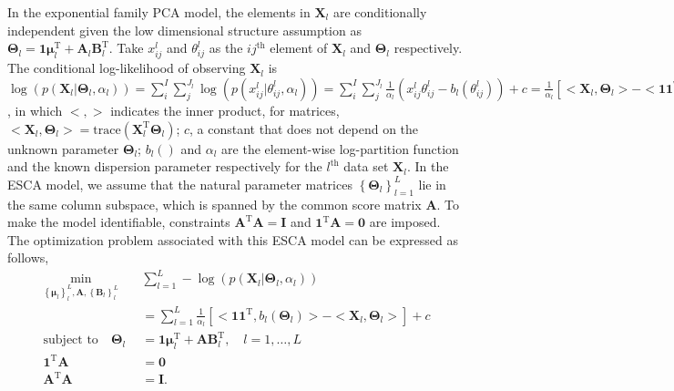 In the exponential family PCA model, the elements in $\mathbf{X}_l$ are conditionally independent given the low dimensional structure assumption as $\mathbf{\Theta}_l = \mathbf{1}\bm{\mu}_l^{\text{T}} + \mathbf{A}_l\mathbf{B}_l^{\text{T}}$. Take $x_{ij}^{l}$ and $\theta_{ij}^{l}$ as the $ij^{\text{th}}$ element of $\mathbf{X}_l$ and $\mathbf{\Theta}_l$ respectively. The conditional log-likelihood of observing $\mathbf{X}_l$ is $\log(p(\mathbf{X}_l|\mathbf{\Theta}_l,\alpha_l)) =  \sum_{i}^{I}\sum_{j}^{J_l} \log(p(x_{ij}^{l}|\theta_{ij}^{l},\alpha_l)) = \sum_{i}^{I}\sum_{j}^{J_l} \frac{1}{\alpha_l}  (x_{ij}^{l}\theta_{ij}^{l} - b_l(\theta_{ij}^{l})) + c = \frac{1}{\alpha_l} \left[<\mathbf{X}_{l},\mathbf{\Theta}_l> - <\mathbf{1}\mathbf{1}^{\text{T}}, b_l(\mathbf{\Theta}_l)>\right] + c$, in which $<,>$ indicates the inner product, for matrices, $<\mathbf{X}_l,\mathbf{\Theta}_l> = \text{trace}(\mathbf{X}_l^{\text{T}}\mathbf{\Theta}_l)$; $c$, a constant that does not depend on the unknown parameter $\mathbf{\Theta}_l$; $b_l()$ and $\alpha_l$ are the element-wise log-partition function and the known dispersion parameter respectively for the $l^{\text{th}}$ data set $\mathbf{X}_l$. In the ESCA model, we assume that the natural parameter matrices $\left\{ \mathbf{\Theta}_l \right\}_{l=1}^{L}$ lie in the same column subspace, which is spanned by the common score matrix $\mathbf{A}$. To make the model identifiable, constraints $\mathbf{A}^{\text{T}}\mathbf{A} = \mathbf{I}$ and $\mathbf{1}^{\text{T}}\mathbf{A} = \mathbf{0}$ are imposed. The optimization problem associated with this ESCA model can be expressed as follows,
\begin{equation}\label{chapter5_eq:1}
\begin{aligned}
    \min_{ \left\{\bm{\mu}_l\right\}_{l}^{L}, \mathbf{A}, \left\{\mathbf{B}_l\right\}_{l}^{L}} \quad & \sum_{l=1}^{L} -\log(p(\mathbf{X}_l|\mathbf{\Theta}_l, \alpha_l))\\
	& =\sum_{l=1}^{L} \frac{1}{\alpha_l} \left[ <\mathbf{1}\mathbf{1}^{\text{T}}, b_l(\mathbf{\Theta}_l)> - <\mathbf{X}_l, \mathbf{\Theta}_l> \right] + c\\
    \text{subject to} \quad \mathbf{\Theta}_l &= \mathbf{1}\bm{\mu}_l^{\text{T}} + \mathbf{AB}_l^{\text{T}}, \quad l = 1,\ldots,L \\
     \mathbf{1}^{\text{T}}\mathbf{A} &= \mathbf{0}\\
	 \mathbf{A}^{\text{T}}\mathbf{A} &= \mathbf{I}.
\end{aligned}
\end{equation}

